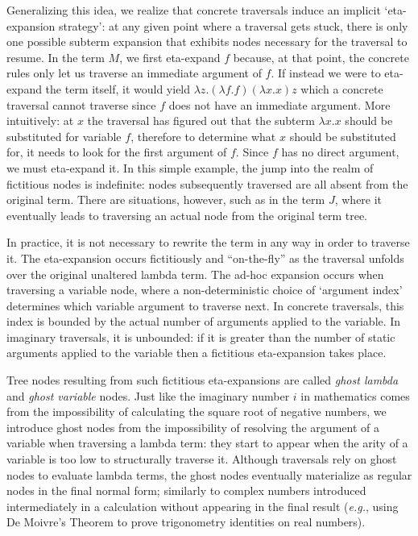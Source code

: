 \documentclass[xchauthor,chkrefs,GCNS,amsmath,amsthm,rotating,leaveRGB]{tcsg}
\theoremstyle{plain}
\theoremstyle{definition}
\begin{document}
Generalizing this idea, we realize that concrete traversals induce an
implicit `eta-expansion strategy': at any given point where a traversal gets
stuck, there is only one possible subterm expansion that exhibits nodes
necessary for the traversal to resume. In the term $M$, we first eta-expand
$f$ because, at that point, the concrete rules only let us traverse an
immediate argument of $f$. If instead we were to eta-expand the term itself,
it would yield $\lambda z. (\lambda f .f)(\lambda x.x) z$ which a concrete
traversal cannot traverse since $f$ does not have an immediate argument. More
intuitively: at $x$ the traversal has figured out that the subterm $\lambda
x.x$ should be substituted for variable $f$, therefore to determine what $x$
should be substituted for, it needs to look for the first argument of $f$.
Since $f$ has no direct argument, we must eta-expand it. In this simple
example, the jump into the realm of fictitious nodes is indefinite: nodes
subsequently traversed are all absent from the original term. There are
situations, however, such as in the term $J$, where it eventually leads to
traversing an actual node from the original term tree.

In practice, it is not necessary to rewrite the term in any way in order to
traverse it. The eta-expansion occurs fictitiously and ``on-the-fly'' as the
traversal unfolds over the original unaltered lambda term. The ad-hoc
expansion occurs when traversing a variable node, where a non-deterministic
choice of `argument index' determines which variable argument to traverse
next. In concrete traversals, this index is bounded by the actual number of
arguments applied to the variable. In imaginary traversals, it is unbounded:
if it is greater than the number of static arguments applied to the variable
then a fictitious eta-expansion takes place.

Tree nodes resulting from such fictitious eta-expansions are called
\emph{ghost lambda} and \emph{ghost variable} nodes. Just like the imaginary
number $i$ in mathematics comes from the impossibility of calculating the
square root of negative numbers, we introduce ghost nodes from the
impossibility of resolving the argument of a variable when traversing a
lambda term: they start to appear when the arity of a variable is too low to
structurally traverse it. Although traversals rely on ghost nodes to evaluate
lambda terms, the ghost nodes eventually materialize as regular nodes in the
final normal form; similarly to complex numbers introduced intermediately in
a calculation without appearing in the final result (\textit{e.g.}, using De
Moivre's Theorem to prove trigonometry identities on real numbers).
\end{document}
